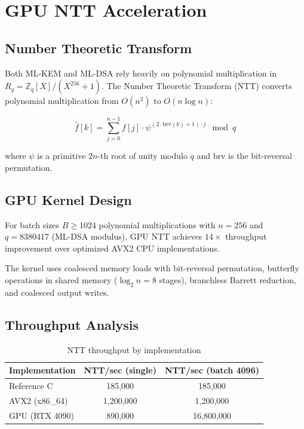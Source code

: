 \section{GPU NTT Acceleration}


\subsection{Number Theoretic Transform}

Both ML-KEM and ML-DSA rely heavily on polynomial multiplication in $R_q = \mathbb{Z}_q[X]/(X^{256} + 1)$. The Number Theoretic Transform (NTT) converts polynomial multiplication from $O(n^2)$ to $O(n \log n)$:

\begin{equation}
\hat{f}[k] = \sum_{j=0}^{n-1} f[j] \cdot \psi^{(2 \cdot \text{brv}(k) + 1) \cdot j} \mod q
\end{equation}

where $\psi$ is a primitive $2n$-th root of unity modulo $q$ and $\text{brv}$ is the bit-reversal permutation.

\subsection{GPU Kernel Design}

\begin{proposition}
For batch sizes $B \geq 1024$ polynomial multiplications with $n = 256$ and $q = 8380417$ (ML-DSA modulus), GPU NTT achieves $14\times$ throughput improvement over optimized AVX2 CPU implementations.
\end{proposition}

The kernel uses coalesced memory loads with bit-reversal permutation, butterfly operations in shared memory ($\log_2 n = 8$ stages), branchless Barrett reduction, and coalesced output writes.

\subsection{Throughput Analysis}

\begin{table}[h]
\centering
\begin{tabular}{lcc}
\toprule
\textbf{Implementation} & \textbf{NTT/sec (single)} & \textbf{NTT/sec (batch 4096)} \\
\midrule
Reference C & 185,000 & 185,000 \\
AVX2 (x86\_64) & 1,200,000 & 1,200,000 \\
GPU (RTX 4090) & 890,000 & 16,800,000 \\
\bottomrule
\end{tabular}
\caption{NTT throughput by implementation}
\label{tab:ntt-throughput}
\end{table}

